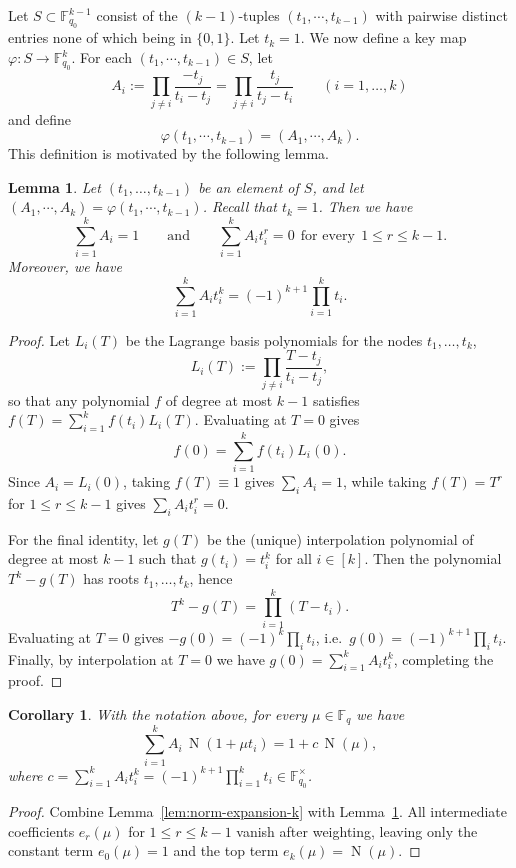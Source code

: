 \documentclass[12pt,reqno]{amsart}
\theoremstyle{plain}
\newtheorem{lemma}[theorem]{Lemma}
\newtheorem{corollary}[theorem]{Corollary}
\theoremstyle{definition}
\newcommand{\F}{\mathbb{F}}
\newcommand{\1}{\mathbf{1}}
\DeclareMathOperator{\Norm}{N}
\begin{document}
Let $S \subset \F_{q_0}^{k - 1}$ consist of the $(k - 1)$-tuples $(t_1, \cdots, t_{k - 1})$ with pairwise distinct entries none of which being in $\{0, 1\}$. Let $t_k = 1$. We now define a key map $\varphi: S \to \F_{q_0}^k$. For each $(t_1, \cdots, t_{k - 1}) \in S$, let
$$A_i := \prod_{j\neq i}\frac{-t_j}{t_i-t_j}=\prod_{j\neq i}\frac{t_j}{t_j-t_i}\qquad (i=1,\dots,k)$$
and define 
$$\varphi(t_1, \cdots, t_{k - 1}) = (A_1, \cdots, A_k).$$
This definition is motivated by the following lemma.
\begin{lemma}\label{lem:lagrange-weights-k}
Let $(t_1,\dots,t_{k - 1})$ be an element of $S$, and let $(A_1, \cdots, A_k) = \varphi(t_1, \cdots, t_{k-1})$. Recall that $t_k = 1$. Then we have
\[
  \sum_{i=1}^k A_i =1
  \qquad\text{and}\qquad
  \sum_{i=1}^k A_i t_i^r =0\ \ \text{for every}\ \ 1\le r\le k-1.
\]
Moreover, we have
\[
  \sum_{i=1}^k A_i t_i^k = (-1)^{k+1}\prod_{i=1}^k t_i.
\]
\end{lemma}

\begin{proof}
Let $L_i(T)$ be the Lagrange basis polynomials for the nodes $t_1,\dots,t_k$,
\[
  L_i(T):=\prod_{j\neq i}\frac{T-t_j}{t_i-t_j},
\]
so that any polynomial $f$ of degree at most $k-1$ satisfies $f(T)=\sum_{i=1}^k f(t_i)L_i(T)$.
Evaluating at $T=0$ gives
\[
  f(0)=\sum_{i=1}^k f(t_i)L_i(0).
\]
Since $A_i=L_i(0)$, taking $f(T)\equiv 1$ gives $\sum_i A_i=1$, while taking $f(T)=T^r$ for $1\le r\le k-1$ gives $\sum_i A_i t_i^r=0$.

For the final identity, let $g(T)$ be the (unique) interpolation polynomial of degree at most $k-1$
such that $g(t_i)=t_i^k$ for all $i \in [k]$.
Then the polynomial $T^k-g(T)$ has roots $t_1,\dots,t_k$, hence
\[
  T^k-g(T)=\prod_{i=1}^k (T-t_i).
\]
Evaluating at $T=0$ gives $-g(0)=(-1)^k\prod_i t_i$, i.e.\ $g(0)=(-1)^{k+1}\prod_i t_i$.
Finally, by interpolation at $T=0$ we have $g(0)=\sum_{i=1}^k A_i t_i^k$, completing the proof.
\end{proof}

\begin{corollary}\label{cor:norm-cancel-k}
With the notation above, for every $\mu\in\F_q$ we have
\[
  \sum_{i=1}^k A_i\,\Norm(1+\mu t_i)=1 + c\,\Norm(\mu),
\]
where $c=\sum_{i=1}^k A_i t_i^k=(-1)^{k+1}\prod_{i=1}^k t_i\in \F_{q_0}^\times$.
\end{corollary}

\begin{proof}
Combine Lemma~\ref{lem:norm-expansion-k} with Lemma~\ref{lem:lagrange-weights-k}.
All intermediate coefficients $e_r(\mu)$ for $1\le r\le k-1$ vanish after weighting, leaving only the constant term $e_0(\mu)=1$
and the top term $e_k(\mu)=\Norm(\mu)$.
\end{proof}
\end{document}

